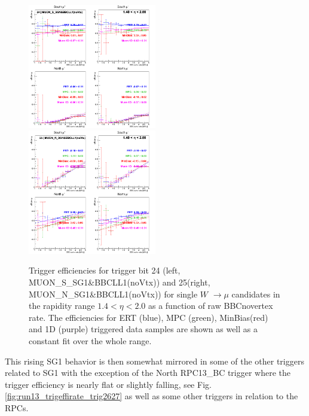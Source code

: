 \begin{figure}[ht]
\begin{center}
\includegraphics[width=0.5\textwidth]{./figures/run13_trigeffirate_eta1_trig24_lin.png}
\includegraphics[width=0.5\textwidth]{./figures/run13_trigeffirate_eta1_trig25_lin.png}
\caption{\label{fig:run13_trigeffirate_trig2425} Trigger efficiencies for trigger bit 24 (left, MUON\_S\_SG1\&BBCLL1(noVtx)) and 25(right, MUON\_N\_SG1\&BBCLL1(noVtx)) for single $W$ $\rightarrow \mu$ candidates in the rapidity range $ 1.4 < \eta < 2.0$ as a function of raw BBCnovertex rate. The efficiencies for ERT (blue), MPC (green), MinBias(red) and 1D (purple) triggered data samples are shown as well as a constant fit over the whole range.}
\end{center}
\end{figure}
\clearpage
This rising SG1 behavior is then somewhat mirrored in some of the other triggers
related to SG1 with the exception of the North RPC13\_BC trigger where the
trigger efficiency is nearly flat or slightly falling, see Fig.~
\ref{fig:run13_trigeffirate_trig2627} as well as some other triggers in relation
to the RPCs.
